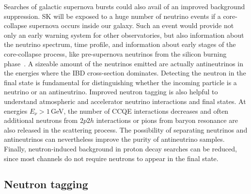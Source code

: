 Searches of galactic supernova bursts could also avail of an improved background suppression.
SK will be exposed to a huge number of neutrino events if a core-collapse supernova occurs inside our galaxy.
Such an event would provide not only an early warning system for other observatories, %
but also information about the neutrino spectrum, time profile, and information about early stages of the core-collapse process, %
like pre-supernova neutrinos from the silicon burning phase~\cite{Simpson:2019xwo}.
A sizeable amount of the neutrinos emitted are actually antineutrinos in the energies where the IBD cross-section dominates.
Detecting the neutron in the final state is fundamental for distinguishing whether the incoming particle is %
a neutrino or an antineutrino.
Improved neutron tagging is also helpful to understand atmospheric and accelerator neutrino interactions and final states.
At energies $E_\nu > 1$\,GeV, the number of CCQE interactions decreases and often additional neutrons %
from $2p2h$ interactions or pions from baryon resonance are also released in the scattering process.
The possibility of separating neutrinos and antineutrinos can nevertheless improve the purity of antineutrino samples.
Finally, neutron-induced background in proton decay searches can be reduced, %
since most channels do not require neutrons to appear in the final state.


\subsection{Neutron tagging}
\label{sec:neutron_tagging}

